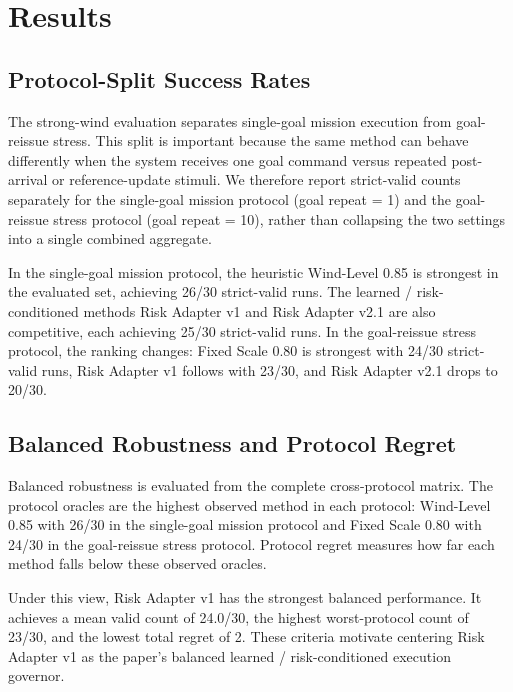 \section{Results}

\subsection{Protocol-Split Success Rates}

The strong-wind evaluation separates single-goal mission execution from
goal-reissue stress. This split is important because the same method can behave
differently when the system receives one goal command versus repeated
post-arrival or reference-update stimuli. We therefore report strict-valid
counts separately for the single-goal mission protocol (goal repeat = 1) and
the goal-reissue stress protocol (goal repeat = 10), rather than collapsing the
two settings into a single combined aggregate.

In the single-goal mission protocol, the heuristic Wind-Level 0.85 is strongest
in the evaluated set, achieving 26/30 strict-valid runs. The learned /
risk-conditioned methods Risk Adapter v1 and Risk Adapter v2.1 are also
competitive, each achieving 25/30 strict-valid runs. In the goal-reissue stress
protocol, the ranking changes: Fixed Scale 0.80 is strongest with 24/30
strict-valid runs, Risk Adapter v1 follows with 23/30, and Risk Adapter v2.1
drops to 20/30.



\subsection{Balanced Robustness and Protocol Regret}

Balanced robustness is evaluated from the complete cross-protocol matrix. The
protocol oracles are the highest observed method in each protocol: Wind-Level
0.85 with 26/30 in the single-goal mission protocol and Fixed Scale 0.80 with
24/30 in the goal-reissue stress protocol. Protocol regret measures how far
each method falls below these observed oracles.

Under this view, Risk Adapter v1 has the strongest balanced performance. It
achieves a mean valid count of 24.0/30, the highest worst-protocol count of
23/30, and the lowest total regret of 2. These criteria motivate centering
Risk Adapter v1 as the paper's balanced learned / risk-conditioned execution
governor.

